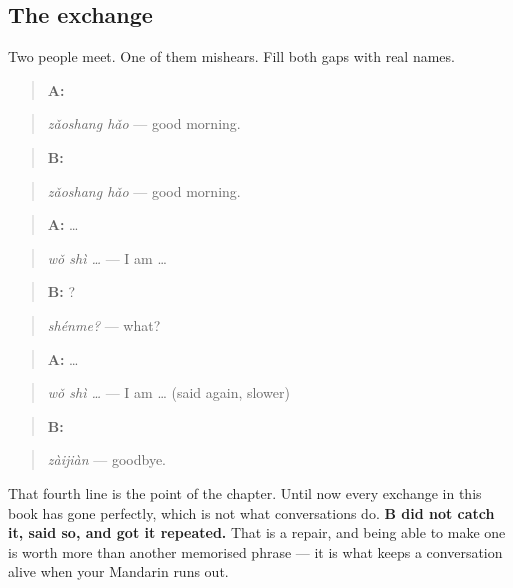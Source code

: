 \subsection*{The exchange}
Two people meet. One of them mishears. Fill both gaps with real names.

\begin{quote}
\textbf{A:} 
\end{quote}

\begin{quote}
\emph{zǎoshang hǎo} — good morning.
\end{quote}

\begin{quote}
\textbf{B:} 
\end{quote}

\begin{quote}
\emph{zǎoshang hǎo} — good morning.
\end{quote}

\begin{quote}
\textbf{A:}  …
\end{quote}

\begin{quote}
\emph{wǒ shì …} — I am …
\end{quote}

\begin{quote}
\textbf{B:} ?
\end{quote}

\begin{quote}
\emph{shénme?} — what?
\end{quote}

\begin{quote}
\textbf{A:}  …
\end{quote}

\begin{quote}
\emph{wǒ shì …} — I am … (said again, slower)
\end{quote}

\begin{quote}
\textbf{B:} 
\end{quote}

\begin{quote}
\emph{zàijiàn} — goodbye.
\end{quote}

That fourth line is the point of the chapter. Until now every exchange in this book has gone perfectly, which is not what conversations do. \textbf{B did not catch it, said so, and got it repeated.} That is a repair, and being able to make one is worth more than another memorised phrase — it is what keeps a conversation alive when your Mandarin runs out.


